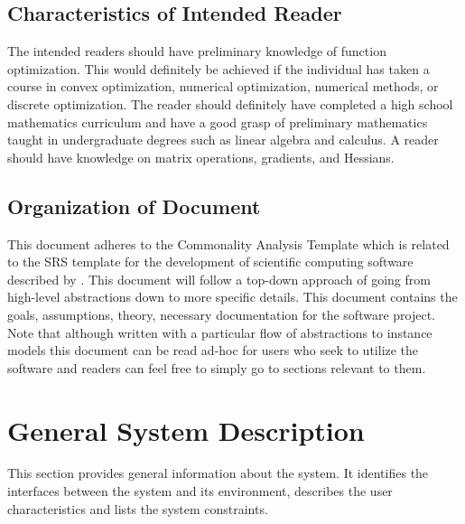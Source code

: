 \documentclass[12pt]{article}
\begin{document}


\subsection{Characteristics of Intended Reader} \label{sec_IntendedReader}
The intended readers should have preliminary knowledge of function optimization. This would definitely be achieved if the individual has taken a course in convex optimization, numerical optimization, numerical methods, or discrete optimization. The reader should definitely have completed a high school mathematics curriculum and have a good grasp of preliminary mathematics taught in undergraduate degrees such as linear algebra and calculus. A reader should have knowledge on matrix operations, gradients, and Hessians.
\\

\subsection{Organization of Document}
This document adheres to the  Commonality Analysis Template which is related to the SRS template for the development of scientific computing software described by \citep{l}. This document will follow a top-down approach of going from high-level abstractions down to more specific details. This document contains the goals, assumptions, theory, necessary documentation for the software project. Note that although written with a particular flow of abstractions to instance models this document can be read ad-hoc for users who seek to utilize the software and readers can feel free to simply go to sections relevant to them. 
\\



\section{General System Description}
This section provides general information about the system.  It identifies the
interfaces between the system and its environment, describes the user
characteristics and lists the system constraints.
\\
\end{document}
